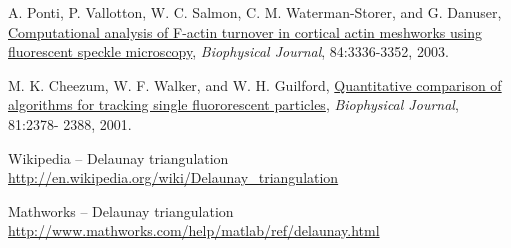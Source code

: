 \documentclass{article}
\begin{document}
\pagebreak
\begin{thebibliography}{9}
\fontsize{10pt}{12pt}\selectfont
\raggedright

        A. Ponti, P. Vallotton, W. C. Salmon, C. M. Waterman-Storer, and G.
        Danuser, \ul{Computational analysis of F-actin turnover in cortical
        actin meshworks using fluorescent speckle microscopy}, {\em Biophysical
        Journal}, 84:3336-3352, 2003.

        M. K. Cheezum, W. F. Walker, and W. H. Guilford, 
        \ul{Quantitative comparison of algorithms for tracking single 
        fluororescent particles}, {\em Biophysical Journal}, 81:2378- 2388, 2001.

        Wikipedia -- Delaunay triangulation
        \url{http://en.wikipedia.org/wiki/Delaunay_triangulation}
    
        Mathworks -- Delaunay triangulation
        \url{http://www.mathworks.com/help/matlab/ref/delaunay.html}

\end{thebibliography}


\end{document}
